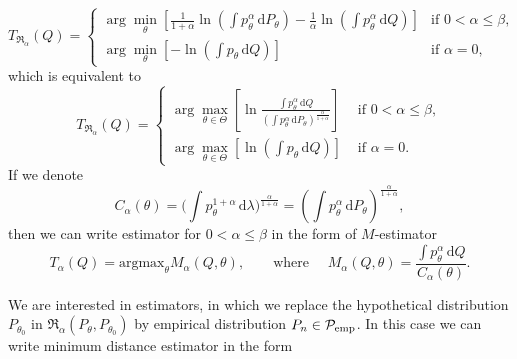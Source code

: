 \begin{equation}
	T_{\mathfrak{R}_\alpha}(Q) =
	\begin{cases}
		 \arg \min_{\theta} \left[\frac{1}{1+\alpha} \ln(\int p_\theta^\alpha\, \mathrm{d}P_\theta) - \frac{1}{\alpha} \ln(\int p_\theta^\alpha\, \mathrm{d}Q) \right] & \text{if } 0 < \alpha \leq \beta, \\
		 \arg \min_{\theta} \left[- \ln(\int p_\theta\, \mathrm{d}Q) \right] & \text{if } \alpha = 0,
	\end{cases}	
\end{equation}
which is equivalent to 
\begin{equation}
	T_{\mathfrak{R}_\alpha}(Q) = 
	\begin{cases}
		 \displaystyle{ \arg \max_{\theta \in \Theta} \left[\ln\frac{\int p_\theta^\alpha\, \mathrm{d}Q}{(\int p_\theta^\alpha\, \mathrm{d}P_\theta)^{\frac{\alpha}{1+\alpha}}} \right] }& \text{ if } 0 < \alpha \leq \beta, \\[5mm]
		 \displaystyle{ \arg \max_{\theta \in \Theta} \left[\ln(\int p_\theta\, \mathrm{d}Q) \right] }& \text{ if } \alpha = 0.
	\end{cases}	
\end{equation}
If we denote
\begin{equation}
C_{\alpha}(\theta) = \biggl(\int p_{\theta}^{1+\alpha} \, \mathrm{d}\lambda\biggr)^{\frac{\alpha}{1+\alpha}} = \left( \int p_\theta^\alpha\, \mathrm{d}P_\theta \right)^{\frac{\alpha}{1+\alpha}},
\end{equation}
then we can write \ren estimator for $0<\alpha \leq \beta$ in the form of $M$-estimator
\begin{equation}
T_{\alpha}(Q) = \text{argmax}_{\theta} M_{\alpha}(Q,\theta), \qquad \text{where } \quad M_{\alpha}(Q,\theta) = \frac{\int p_{\theta}^{\alpha}\, \mathrm{d}Q}{C_{\alpha}(\theta)}.
\end{equation}

We are interested in estimators, in which we replace the hypothetical distribution $P_{\theta_0}$ in $\mathfrak{R}_\alpha(P_\theta, P_{\theta_0})$ by empirical distribution $P_n \in \mathcal{P}_\mathrm{emp}$. In this case we can write minimum \ren distance estimator in the form


